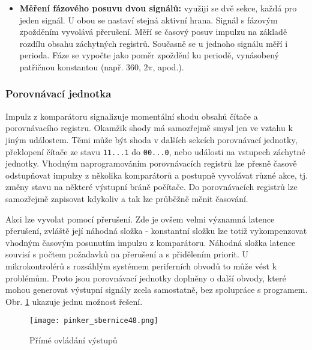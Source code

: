 \begin{itemize}[noitemsep]
          \item \textbf{Měření fázového posuvu dvou signálů:}  využijí se dvě sekce, každá pro  
                jeden signál. U obou se nastaví stejná aktivní hrana. Signál s fázovým zpožděním 
                vyvolává přerušení. Měří se časový posuv impulzu na základě rozdílu obsahu 
                záchytných registrů. Současně se u jednoho signálu měří i perioda. Fáze se vypočte 
                jako poměr zpoždění ku periodě, vynásobený patřičnou konstantou (např. 360, 
                \(2\pi\), apod.).
        \end{itemize}
        
      \subsubsection{Porovnávací jednotka}
        Impulz z komparátoru signalizuje momentální shodu obsahů čítače a porovnávacího registru. 
        Okamžik shody má samozřejmě smysl jen ve vztahu k jiným událostem. Těmi může být shoda v 
        dalších sekcích porovnávací jednotky, překlopení čítače ze stavu \texttt{11...1} do 
        \texttt{00...0}, nebo události na vstupech záchytné jednotky. Vhodným naprogramováním 
        porovnávacích registrů lze přesně časově odstupňovat impulzy z několika komparátorů a 
        postupně vyvolávat různé akce, tj. změny stavu na některé výstupní bráně počítače. Do 
        porovnávacích registrů lze samozřejmě zapisovat kdykoliv a tak lze průběžně měnit časování.
        
        Akci lze vyvolat pomocí přerušení. Zde je ovšem velmi významná latence přerušení, zvláště 
        její náhodná složka - konstantní složku lze totiž vykompenzovat vhodným časovým posunutím 
        impulzu z komparátoru. Náhodná složka latence souvisí s počtem požadavků na přerušení a s 
        přidělením priorit. U mikrokontrolérů s rozsáhlým systémem periferních obvodů to může vést 
        k problémům. Proto jsou porovnávací jednotky doplněny o další obvody, které mohou generovat 
        výstupní signály zcela samostatně, bez spolupráce s programem. Obr. 
        \ref{MIT:fig_sbernice48} ukazuje jednu možnost řešení.
        
        \begin{figure}[ht!] %
          \centering
          \texttt{[image: pinker\_sbernice48.png]}
          \caption{Přímé ovládání výstupů}
          \label{MIT:fig_sbernice48}
        \end{figure}
        
